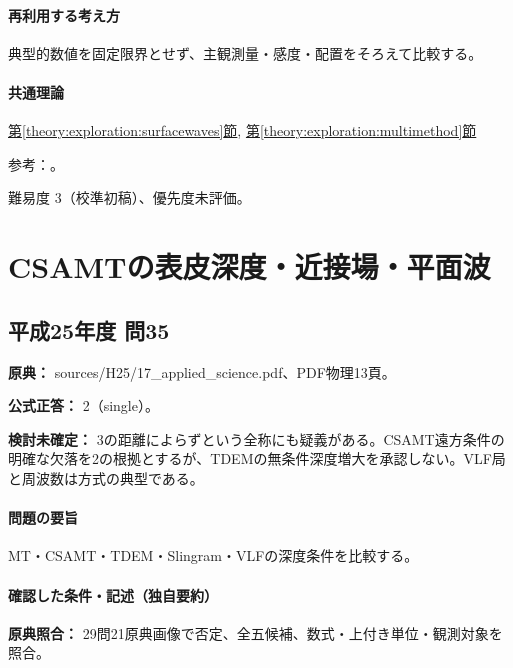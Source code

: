 \paragraph{再利用する考え方} 典型的数値を固定限界とせず、主観測量・感度・配置をそろえて比較する。

\paragraph{共通理論} \hyperref[theory:exploration:surfacewaves]{第\ref*{theory:exploration:surfacewaves}節}, \hyperref[theory:exploration:multimethod]{第\ref*{theory:exploration:multimethod}節}

\par 参考：\cite{epa_surfacewaves,gsi_gravity_definitions,naro_thermal2008,landslide_thermal2007}。

\par 難易度 3（校準初稿）、優先度未評価。

\section{CSAMTの表皮深度・近接場・平面波}

\subsection{平成25年度 問35}
\label{q:h25-reg-applied-35}

\noindent\textbf{原典：} sources/H25/17\_applied\_science.pdf、PDF物理13頁。

\textbf{公式正答：} 2（single）。

\par\textbf{検討未確定：} 3の距離によらずという全称にも疑義がある。CSAMT遠方条件の明確な欠落を2の根拠とするが、TDEMの無条件深度増大を承認しない。VLF局と周波数は方式の典型である。

\paragraph{問題の要旨} MT・CSAMT・TDEM・Slingram・VLFの深度条件を比較する。

\paragraph{確認した条件・記述（独自要約）}\mbox{}\par

\noindent\textbf{原典照合：} 29問21原典画像で否定、全五候補、数式・上付き単位・観測対象を照合。\par

